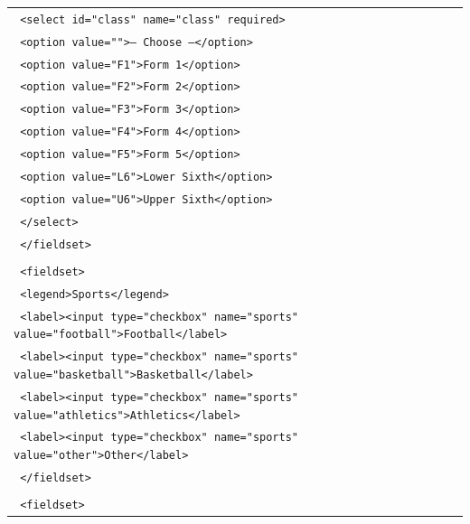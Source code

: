 \documentclass[11pt]{article}
\begin{document}
\begin{exoresolu}
\begin{tabular}{@{}l@{}}
\texttt{    \textless select id="class" name="class" required\textgreater} \\
\texttt{      \textless option value=""\textgreater-- Choose --\textless/option\textgreater} \\
\texttt{      \textless option value="F1"\textgreater Form 1\textless/option\textgreater} \\
\texttt{      \textless option value="F2"\textgreater Form 2\textless/option\textgreater} \\
\texttt{      \textless option value="F3"\textgreater Form 3\textless/option\textgreater} \\
\texttt{      \textless option value="F4"\textgreater Form 4\textless/option\textgreater} \\
\texttt{      \textless option value="F5"\textgreater Form 5\textless/option\textgreater} \\
\texttt{      \textless option value="L6"\textgreater Lower Sixth\textless/option\textgreater} \\
\texttt{      \textless option value="U6"\textgreater Upper Sixth\textless/option\textgreater} \\
\texttt{    \textless/select\textgreater} \\
\texttt{  \textless/fieldset\textgreater} \\
\texttt{} \\
\texttt{  \textless fieldset\textgreater} \\
\texttt{    \textless legend\textgreater Sports\textless/legend\textgreater} \\
\texttt{    \textless label\textgreater\textless input type="checkbox" name="sports" value="football"\textgreater Football\textless/label\textgreater} \\
\texttt{    \textless label\textgreater\textless input type="checkbox" name="sports" value="basketball"\textgreater Basketball\textless/label\textgreater} \\
\texttt{    \textless label\textgreater\textless input type="checkbox" name="sports" value="athletics"\textgreater Athletics\textless/label\textgreater} \\
\texttt{    \textless label\textgreater\textless input type="checkbox" name="sports" value="other"\textgreater Other\textless/label\textgreater} \\
\texttt{  \textless/fieldset\textgreater} \\
\texttt{} \\
\texttt{  \textless fieldset\textgreater} \\

\end{tabular}
\end{exoresolu}
\end{document}
